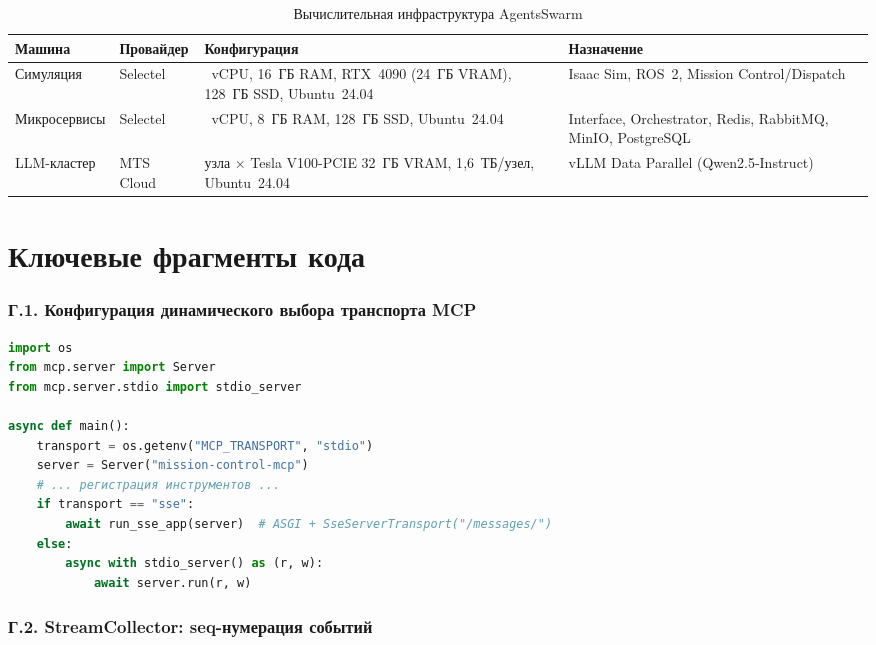 \documentclass[14pt,a4paper]{extreport}
\begin{document}
\begin{table}[H]
\caption*{Вычислительная инфраструктура AgentsSwarm}
\begin{tabular}{@{}>{\raggedright\arraybackslash}p{3.3cm}
                >{\raggedright\arraybackslash}p{2.4cm}
                >{\raggedright\arraybackslash}p{5.2cm}
                >{\raggedright\arraybackslash}p{3.7cm}@{}}
\toprule
\textbf{Машина} & \textbf{Провай\-дер} & \textbf{Конфигурация} & \textbf{Назначение} \\
\midrule
Симуляция & Selectel & 4~vCPU, 16~ГБ RAM, RTX~4090 (24~ГБ VRAM), 128~ГБ SSD, Ubuntu~24.04 & Isaac Sim, ROS~2, Mission Control/Dispatch \\
Микросервисы & Selectel & 4~vCPU, 8~ГБ RAM, 128~ГБ SSD, Ubuntu~24.04 & Interface, Orchestrator, Redis, RabbitMQ, MinIO, PostgreSQL \\
LLM-кластер & MTS Cloud & 2 узла × Tesla V100-PCIE 32~ГБ VRAM, 1{,}6~ТБ/узел, Ubuntu~24.04 & vLLM Data Parallel (Qwen2.5-Instruct) \\
\bottomrule
\end{tabular}
\end{table}

\chapter{Ключевые фрагменты кода}

\subsection*{Г.1. Конфигурация динамического выбора транспорта MCP}

\begin{lstlisting}[language=Python, caption={Выбор транспорта MCP через переменную окружения}]
import os
from mcp.server import Server
from mcp.server.stdio import stdio_server

async def main():
    transport = os.getenv("MCP_TRANSPORT", "stdio")
    server = Server("mission-control-mcp")
    # ... регистрация инструментов ...
    if transport == "sse":
        await run_sse_app(server)  # ASGI + SseServerTransport("/messages/")
    else:
        async with stdio_server() as (r, w):
            await server.run(r, w)
\end{lstlisting}

\subsection*{Г.2. StreamCollector: seq-нумерация событий}
\end{document}
